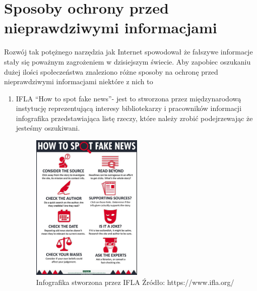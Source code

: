 \section{Sposoby ochrony przed nieprawdziwymi informacjami}
Rozwój tak potężnego narzędzia jak Internet spowodował że fałszywe informacje
stały się poważnym zagrożeniem  w dzisiejszym świecie. Aby zapobiec oszukaniu 
dużej ilości społeczeństwa znaleziono różne sposoby na ochronę przed nieprawdziwymi
informacjami niektóre z nich to 
\begin{enumerate}
    \item IFLA ``How to spot fake news''- jest to stworzona przez międzynarodową instytucję
    reprezentującą interesy bibliotekarzy i pracowników informacji infografika
    przedstawiająca listę rzeczy, które należy zrobić podejrzewając że jesteśmy oszukiwani.

    \begin{figure}[h!]
        \centering
        \includegraphics[width=0.5\textwidth]{./Img/how-to-spot-fake-news.jpg}
        \caption{Infografika stworzona przez IFLA Źródło: https://www.ifla.org/}
    \end{figure}


\end{enumerate}
